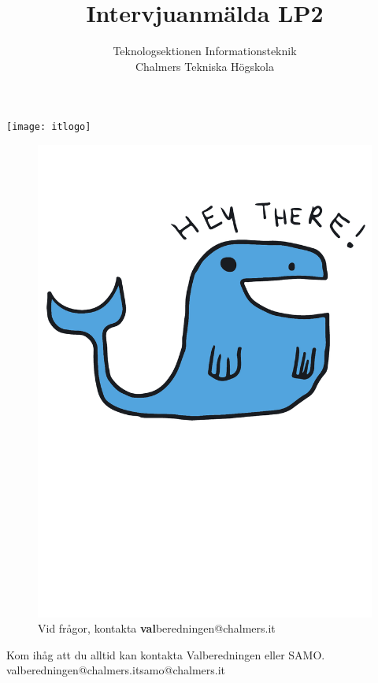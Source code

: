 \documentclass[11pt, noincludeaddress, nopagination]{classes/cthit}
\begin{document}
\thispagestyle{empty}

\title{Intervjuanmälda LP2 \the\year}
\subtitle{ \large Teknologsektionen Informationsteknik \\ Chalmers Tekniska Högskola}

\begin{center}
\texttt{[image: itlogo]}
\end{center}

\makeheadfoot%

\makesimpletitle
\vspace{1cm}

\newpage
\thispagestyle{empty}

\begin{figure}[h]
    \centering
    \includegraphics[width=\textwidth, angle=2]{whale}
    Vid frågor, kontakta \textbf{val}beredningen@chalmers.it
\end{figure}

\clearpage

\begin{center}
    Kom ihåg att du alltid kan kontakta Valberedningen eller SAMO.\\
    valberedningen@chalmers.it\hspace{25pt}samo@chalmers.it
\end{center}

\begin{itemize}
   
\end{itemize}
\end{document}

